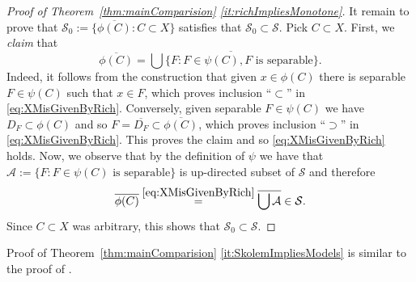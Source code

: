 \documentclass[11pt]{amsart}
\theoremstyle{definition}
\theoremstyle{remark}
\newcommand{\A}{\mathcal A}
\newcommand{\SSS}{\mathcal S}
\begin{document}
\begin{proof}[Proof of Theorem~\ref{thm:mainComparision} \eqref{it:richImpliesMonotone}]
It remain to prove that $\SSS_0:=\{\overline{\phi(C)}\colon C\subset X\}$ satisfies that $\SSS_0\subset \SSS$. Pick $C\subset X$. First, we \emph{claim} that
\begin{equation}\label{eq:XMisGivenByRich}
\overline{\phi(C)} = \overline{\bigcup\{F\colon F\in\psi(C), F\text{ is separable}}\}.
\end{equation}
Indeed, it follows from the construction that given $x\in \phi(C)$ there is separable $F\in\psi(C)$ such that $x\in F$, which proves inclusion ``$\subset$'' in \eqref{eq:XMisGivenByRich}. Conversely, given separable $F\in\psi(C)$ we have $D_F\subset \phi(C)$ and so $F = \overline{D_F}\subset \overline{\phi(C)}$, which proves inclusion ``$\supset$'' in \eqref{eq:XMisGivenByRich}. This proves the claim and so \eqref{eq:XMisGivenByRich} holds. Now, we observe that by the definition of $\psi$ we have that $\A:=\{F\colon F\in \psi(C)\text{ is separable}\}$ is up-directed subset of $\SSS$ and therefore
\[
\overline{\phi(C)} \stackrel{\eqref{eq:XMisGivenByRich}}{=} \overline{\bigcup \A}\in\SSS.
\]
Since $C\subset X$ was arbitrary, this shows that $\SSS_0\subset \SSS$.
\end{proof}

Proof of Theorem~\ref{thm:mainComparision} \eqref{it:SkolemImpliesModels} is similar to the proof of \cite[Proposition 3.1]{CK04}.
\end{document}
